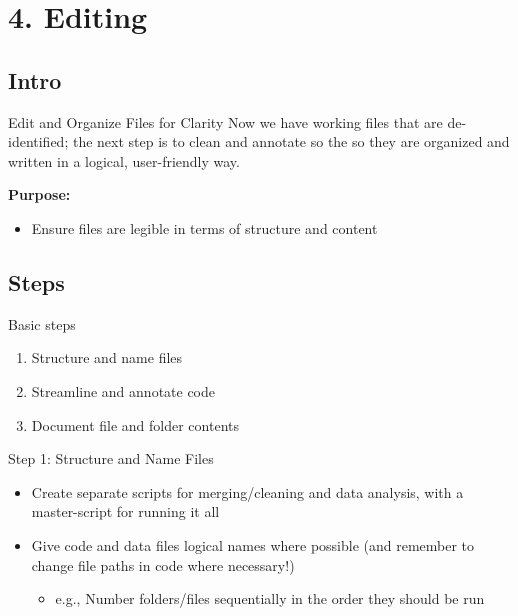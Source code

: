 \documentclass[12pt, compress]{beamer} %
\let\olditem\item %
\renewcommand{\item}{%
\olditem\vspace{\fill}}
\begin{document}

 \section{4. Editing}
 
 \subsection{Intro}
 
 	\begin{frame}{Edit and Organize Files for Clarity}
 	Now we have working files that are de-identified; the next step is to clean and annotate so the so they are organized and written in a logical, user-friendly way. 
 	
 	\bigskip
 	
 		\textbf{Purpose:}
 		\begin{itemize}
 			\item Ensure files are \textcolor{burntorange}{legible} in terms of structure and content
 		\end{itemize}
 	\end{frame}
 
 \subsection{Steps}
 
 	\begin{frame}{Basic steps}
 		\begin{enumerate}
 			\item Structure and name files
 			\item Streamline and annotate code
 			\item Document file and folder contents
 		\end{enumerate}
 	\end{frame}
 
 	\begin{frame}{Step 1: Structure and Name Files}
 		
 		\begin{itemize}
 			\item	 Create separate scripts for merging/cleaning and data analysis, with a master-script for running it all
 			\item Give code and data files logical names where possible (and remember to change file paths in code where necessary!)
 			\begin{itemize}
 				\item e.g., Number folders/files sequentially in the order they should be run
 			\end{itemize}
 		\end{itemize}
 	\end{frame}
 
\end{document}
